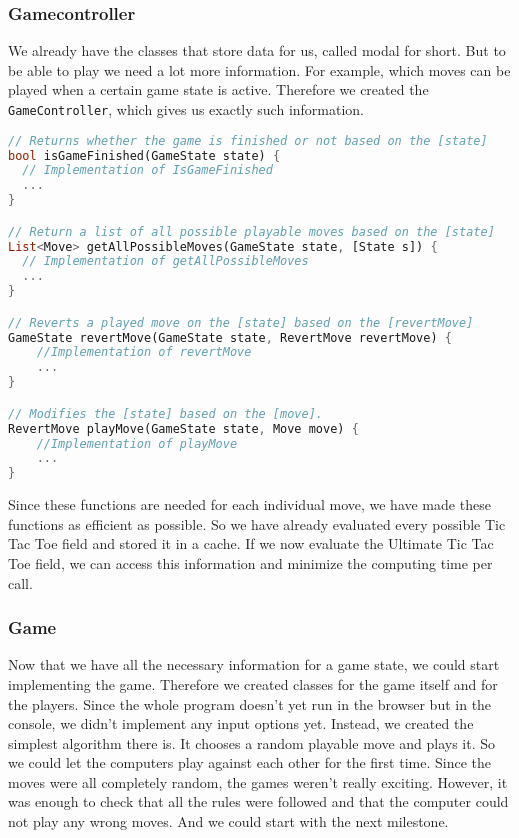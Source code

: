 \subsubsection{Gamecontroller}
We already have the classes that store data for us, called modal for short. But to be able to play we need a lot more information. For example, which moves can be played when a certain game state is active. Therefore we created the \texttt{GameController}, which gives us exactly such information.
\begin{lstlisting}[language=Dart,caption={Structure of the \texttt{GameController}}]
// Returns whether the game is finished or not based on the [state]
bool isGameFinished(GameState state) {
  // Implementation of IsGameFinished
  ...
}

// Return a list of all possible playable moves based on the [state]
List<Move> getAllPossibleMoves(GameState state, [State s]) {
  // Implementation of getAllPossibleMoves
  ...
}

// Reverts a played move on the [state] based on the [revertMove]
GameState revertMove(GameState state, RevertMove revertMove) {
	//Implementation of revertMove
	...
}

// Modifies the [state] based on the [move].
RevertMove playMove(GameState state, Move move) {
	//Implementation of playMove
	...
}
\end{lstlisting}
Since these functions are needed for each individual move, we have made these functions as efficient as possible. So we have already evaluated every possible Tic Tac Toe field and stored it in a cache. If we now evaluate the Ultimate Tic Tac Toe field, we can access this information and minimize the computing time per call.

\subsubsection{Game}
Now that we have all the necessary information for a game state, we could start implementing the game. Therefore we created classes for the game itself and for the players. Since the whole program doesn't yet run in the browser but in the console, we didn't implement any input options yet. Instead, we created the simplest algorithm there is. It chooses a random playable move and plays it. So we could let the computers play against each other for the first time. Since the moves were all completely random, the games weren't really exciting. However, it was enough to check that all the rules were followed and that the computer could not play any wrong moves. And we could start with the next milestone.

